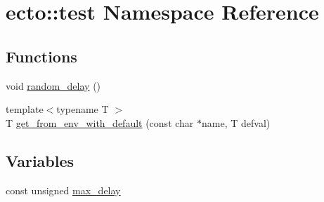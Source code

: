 \hypertarget{namespaceecto_1_1test}{\section{ecto\-:\-:test \-Namespace \-Reference}
\label{namespaceecto_1_1test}
}
\subsection*{\-Functions}
\begin{DoxyCompactItemize}
\item 
void \hyperlink{namespaceecto_1_1test_ab6aaaa31355ed0c3c07380853b4ee174}{random\-\_\-delay} ()
\item 
{\footnotesize template$<$typename T $>$ }\\\-T \hyperlink{namespaceecto_1_1test_abdfa3ef5cd4f48e6a428bf0d8c500450}{get\-\_\-from\-\_\-env\-\_\-with\-\_\-default} (const char $\ast$name, \-T defval)
\end{DoxyCompactItemize}
\subsection*{\-Variables}
\begin{DoxyCompactItemize}
\item 
const unsigned \hyperlink{namespaceecto_1_1test_ae34aab3f49c4e0d8ba421135cafca312}{max\-\_\-delay}
\end{DoxyCompactItemize}


